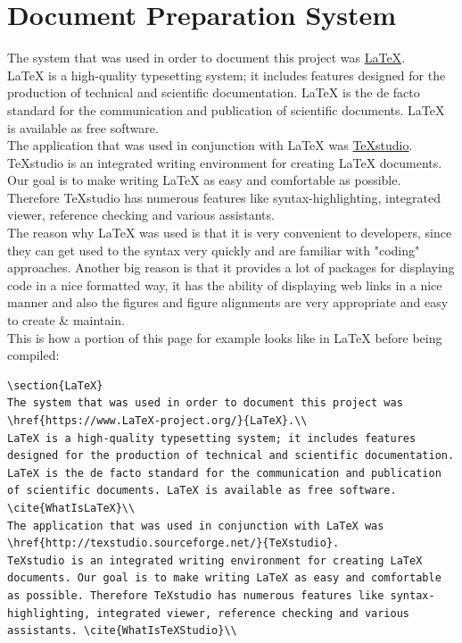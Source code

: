 \section{Document Preparation System}
The system that was used in order to document this project was \href{https://www.LaTeX-project.org/}{LaTeX}.\\
LaTeX is a high-quality typesetting system; it includes features designed for the production of technical and scientific documentation. LaTeX is the de facto standard for the communication and publication of scientific documents. LaTeX is available as free software. \cite{WhatIsLaTeX}\\
The application that was used in conjunction with LaTeX was \href{http://texstudio.sourceforge.net/}{TeXstudio}.
TeXstudio is an integrated writing environment for creating LaTeX documents. Our goal is to make writing LaTeX as easy and comfortable as possible. Therefore TeXstudio has numerous features like syntax-highlighting, integrated viewer, reference checking and various assistants. \cite{WhatIsTeXStudio}\\
The reason why LaTeX was used is that it is very convenient to developers, since they can get used to the syntax very quickly and are familiar with "coding" approaches. Another big reason is that it provides a lot of packages for displaying code in a nice formatted way, it has the ability of displaying web links in a nice manner and also the figures and figure alignments are very appropriate and easy to create \& maintain.\\
\newline
This is how a portion of this page for example looks like in LaTeX before being compiled:
\begin{verbatim}
\section{LaTeX}
The system that was used in order to document this project was \href{https://www.LaTeX-project.org/}{LaTeX}.\\
LaTeX is a high-quality typesetting system; it includes features designed for the production of technical and scientific documentation. LaTeX is the de facto standard for the communication and publication of scientific documents. LaTeX is available as free software. \cite{WhatIsLaTeX}\\
The application that was used in conjunction with LaTeX was \href{http://texstudio.sourceforge.net/}{TeXstudio}.
TeXstudio is an integrated writing environment for creating LaTeX documents. Our goal is to make writing LaTeX as easy and comfortable as possible. Therefore TeXstudio has numerous features like syntax-highlighting, integrated viewer, reference checking and various assistants. \cite{WhatIsTeXStudio}\\
\end{verbatim}
